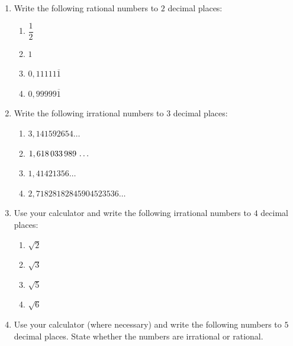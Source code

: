 \begin{eocexercises}{}
\begin{enumerate}[itemsep=5pt, label=\textbf{\arabic*}. ]

\item Write the following rational numbers to $2$ decimal places:
    \begin{enumerate}[itemsep=5pt, label=\textbf{\alph*}. ] 
    \item $\dfrac{1}{2}$\label{m38349*uid19}\item $1$
    \item $0,11111\overline{1}$\label{m38349*uid21}\item $0,99999\overline{1}$
    \end{enumerate}
\item Write the following irrational numbers to $3$ decimal places:
    \begin{enumerate}[itemsep=5pt, label=\textbf{\alph*}. ] 
    \item $3,141592654\ldots$
    \item $1,618\phantom{\rule{0.166667em}{0ex}}033\phantom{\rule{0.166667em}{0ex}}989\phantom{\rule{0.166667em}{0ex}}\ldots$
    \item $1,41421356\ldots$
    \item $2,71828182845904523536\ldots$
    \end{enumerate}
\item Use your calculator and write the following irrational numbers to $4$ decimal places:
    \begin{enumerate}[itemsep=5pt, label=\textbf{\alph*}. ] 
    \item $\sqrt{2}$
    \item $\sqrt{3}$
    \item $\sqrt{5}$
    \item $\sqrt{6}$
    \end{enumerate}
\item Use your calculator (where necessary) and write the following numbers to $5$ decimal places. State whether the numbers are irrational or rational.

\end{enumerate}
\end{eocexercises}
